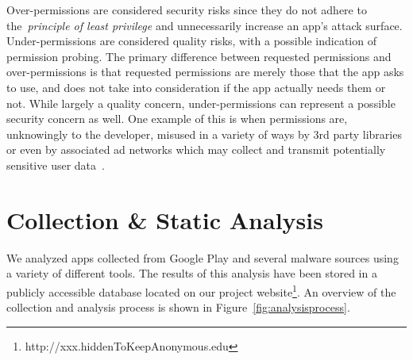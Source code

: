 \documentclass{llncs}
\newif\ifisnopii
\begin{document}
Over-permissions are considered security risks since they do not adhere to the~\emph{principle of least privilege} and unnecessarily increase an app's attack surface. Under-permissions are considered quality risks, with a possible indication of permission probing. The primary difference between requested permissions and over-permissions is that requested permissions are merely those that the app asks to use, and does not take into consideration if the app actually needs them or not. While largely a quality concern, under-permissions can represent a possible security concern as well. One example of this is when permissions are, unknowingly to the developer, misused in a variety of ways by 3rd party libraries or even by associated ad networks which may collect and transmit potentially sensitive user data~\cite{Grace:2012:UEA:2185448.2185464}.




\section{Collection \& Static Analysis}
\label{sec: csa}

We analyzed apps collected from Google Play and several malware sources using a variety of different tools. The results of this analysis have been stored in a publicly accessible database located on our project website\footnote{\ifisnopii http://darwin.rit.edu \else http://xxx.hiddenToKeepAnonymous.edu \fi}. An overview of the collection and analysis process is shown in Figure~\ref{fig:analysisprocess}.
\end{document}
